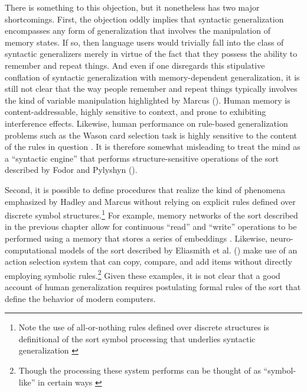There is something to this objection, but it nonetheless has two major shortcomings. First, the objection oddly implies that syntactic generalization encompasses any form of generalization that involves the manipulation of memory states. If so, then language users would trivially fall into the class of syntactic generalizers merely in virtue of the fact that they possess the ability to remember and repeat things. And even if one disregards this stipulative conflation of syntactic generalization with memory-dependent generalization, it is still not clear that the way people remember and repeat things typically involves the kind of variable manipulation highlighted by Marcus (\citeyear{Marcus:1998}). Human memory is content-addressable, highly sensitive to context, and prone to exhibiting interference effects. Likewise, human performance on rule-based generalization problems such as the Wason card selection task is highly sensitive to the content of the rules in question \citep{Eliasmith:2013,Thagard:2005}. It is therefore somewhat misleading to treat the mind as a ``syntactic engine'' that performs structure-sensitive operations of the sort described by Fodor and Pylyshyn (\citeyear{FodorPylyshyn:1988}). 

Second, it is possible to define procedures that realize the kind of phenomena emphasized by Hadley and Marcus without relying on explicit rules defined over discrete symbol structures.\footnote{Note the use of all-or-nothing rules defined over discrete structures is definitional of the sort symbol processing that underlies syntactic generalization \citep{FodorPylyshyn:1988}} For example, memory networks of the sort described in the previous chapter allow for continuous ``read'' and ``write'' operations to be performed using a memory that stores a series of embeddings \citep{Sukhbataar:2015,Graves:2014}. Likewise, neuro-computational models of the sort described by Eliasmith et al. (\citeyear{Eliasmith:2012}) make use of an action selection system that can copy, compare, and add items without directly employing symbolic rules.\footnote{Though the processing these system performs can be thought of as ``symbol-like'' in certain ways \citep{Eliasmith:2013}} Given these examples, it is not clear that a good account of human generalization requires postulating formal rules of the sort that define the behavior of modern computers. 

